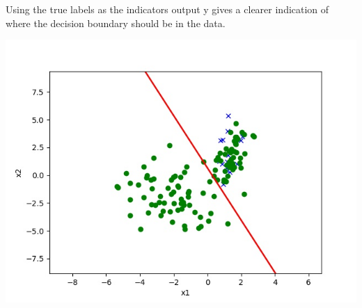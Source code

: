\begin{answer}
Using the true labels as the indicators output y gives a clearer indication of where the decision boundary should be in the data.

\includegraphics{posonly_b}

\end{answer}